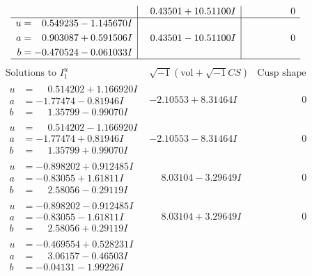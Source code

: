 \documentclass[1p]{elsarticle_modified}
\theoremstyle{definition}
\newcommand{\I}{\sqrt{-1}}
\begin{document}
$$\begin{array}{c|c|c}
 & \phantom{-}0.43501 + 10.51100 I & \phantom{-0.000000 } 0 \\ \hline\begin{aligned}
u &= \phantom{-}0.549235 - 1.145670 I \\
a &= \phantom{-}0.903087 + 0.591506 I \\
b &= -0.470524 - 0.061033 I\end{aligned}
 & \phantom{-}0.43501 - 10.51100 I & \phantom{-0.000000 } 0\\
 \hline 
 \end{array}$$\newpage$$\begin{array}{c|c|c}  
\text{Solutions to }I^u_{1}& \I (\text{vol} + \sqrt{-1}CS) & \text{Cusp shape}\\
 \hline 
\begin{aligned}
u &= \phantom{-}0.514202 + 1.166920 I \\
a &= -1.77474 - 0.81946 I \\
b &= \phantom{-}1.35799 - 0.99070 I\end{aligned}
 & -2.10553 + 8.31464 I & \phantom{-0.000000 } 0 \\ \hline\begin{aligned}
u &= \phantom{-}0.514202 - 1.166920 I \\
a &= -1.77474 + 0.81946 I \\
b &= \phantom{-}1.35799 + 0.99070 I\end{aligned}
 & -2.10553 - 8.31464 I & \phantom{-0.000000 } 0 \\ \hline\begin{aligned}
u &= -0.898202 + 0.912485 I \\
a &= -0.83055 + 1.61811 I \\
b &= \phantom{-}2.58056 - 0.29119 I\end{aligned}
 & \phantom{-}8.03104 - 3.29649 I & \phantom{-0.000000 } 0 \\ \hline\begin{aligned}
u &= -0.898202 - 0.912485 I \\
a &= -0.83055 - 1.61811 I \\
b &= \phantom{-}2.58056 + 0.29119 I\end{aligned}
 & \phantom{-}8.03104 + 3.29649 I & \phantom{-0.000000 } 0 \\ \hline\begin{aligned}
u &= -0.469554 + 0.528231 I \\
a &= \phantom{-}3.06157 - 0.46503 I \\
b &= -0.04131 - 1.99226 I\end{aligned}

\end{array}$$
\end{document}
